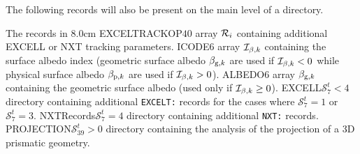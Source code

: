 The following records will also be present on the main level of a 
directory.

\begin{DescriptionEnregistrement}{The  records in }{8.0cm}
\RealEnr
  {EXCELTRACKOP}{$40$}{}
  {array ${\cal R}_i$ containing additional EXCELL or NXT tracking parameters.} 
\IntEnr
  {ICODE}{$6$}
  {array ${\cal I}_{\beta,k}$ containing the surface albedo index (geometric surface albedo
  $\beta_{{\rm g},k}$ are used if ${\cal I}_{\beta,k}< 0$ while physical 
  surface albedo $\beta_{{\rm p},k}$ are used if ${\cal I}_{\beta,k}> 0$).} 
\RealEnr
  {ALBEDO}{$6$}{}
  {array $\beta_{{\rm g},k}$ containing the geometric surface albedo (used only if ${\cal I}_{\beta,k}\ge 0$).}
\OptDirEnr
  {EXCELL}{$\mathcal{S}^{t}_{7}< 4$}
  {directory containing additional {\tt EXCELT:}  records for the cases where $\mathcal{S}^{t}_{7}=1$ or $\mathcal{S}^{t}_{7}=3$.}
\OptDirEnr
  {NXTRecords}{$\mathcal{S}^{t}_{7}=4$}
  {directory containing additional {\tt NXT:} records.}
\OptDirEnr
  {PROJECTION}{$\mathcal{S}^{t}_{39}>0$}
  {directory containing the analysis of the projection of a 3D prismatic geometry.}
\end{DescriptionEnregistrement}

